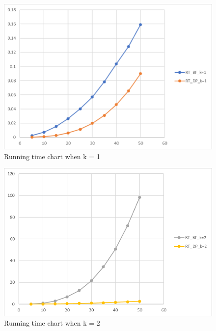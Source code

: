 \documentclass{article}
\theoremstyle{plain}
\theoremstyle{definition}
\theoremstyle{remark}
\begin{document}
\begin{figure}[htbp]
\begin{center}
\includegraphics[scale=0.7]{RT_BF_DP_k-1}
\caption{Running time chart when k = 1} \label{fig:label}
\end{center}
\end{figure}

\begin{figure}[htbp]
\begin{center}
\includegraphics[scale=0.7]{RT_BF_DP_k-2}
\caption{Running time chart when k = 2} \label{fig:label}
\end{center}
\end{figure}
\end{document}
